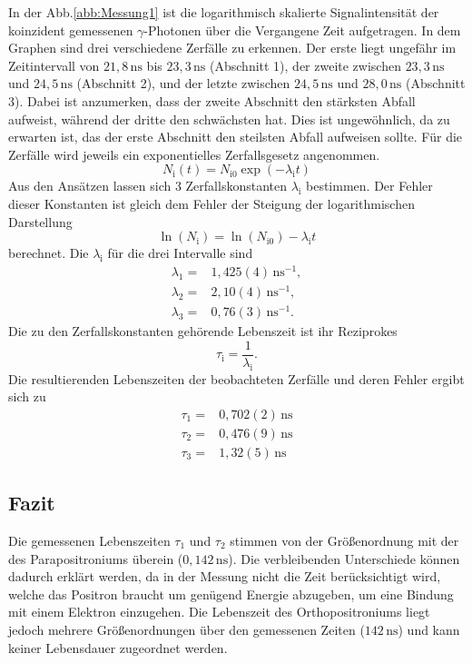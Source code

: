 \documentclass[numbers=noenddot,12pt,a4paper]{scrartcl}
\begin{document}
		In der Abb.\ref{abb:Messung1} ist die logarithmisch skalierte Signalintensität der koinzident gemessenen $\gamma$-Photonen über die Vergangene Zeit aufgetragen.
		In dem Graphen sind drei verschiedene Zerfälle zu erkennen. Der erste liegt ungefähr im Zeitintervall von $21,8\,\mathrm{ns}$ bis $23,3\,\mathrm{ns}$ (Abschnitt 1), der zweite zwischen $23,3\,\mathrm{ns}$ und $24,5\,\mathrm{ns}$ (Abschnitt 2), und der letzte zwischen $24,5\,\mathrm{ns}$ und $28,0\,\mathrm{ns}$ (Abschnitt 3). Dabei ist anzumerken, dass der zweite Abschnitt den stärksten Abfall aufweist, während der dritte den schwächsten hat. Dies ist ungewöhnlich, da zu erwarten ist, das der erste Abschnitt den steilsten Abfall aufweisen sollte. 
		Für die Zerfälle wird jeweils ein exponentielles Zerfallsgesetz angenommen.
		\begin{equation}
			N_\mathrm{i}(t) = N_{\mathrm{i}0} \exp\left(-\lambda_\mathrm{i} t\right)
		\end{equation}
		Aus den Ansätzen lassen sich 3 Zerfallskonstanten $\lambda_\mathrm{i}$ bestimmen. Der Fehler dieser Konstanten ist gleich dem Fehler der Steigung der logarithmischen Darstellung
		\begin{equation}
			\ln\left(N_\mathrm{i}\right) = \ln\left(N_{\mathrm{i}0}\right) - \lambda_\mathrm{i}t
		\end{equation}
		berechnet. Die $\lambda_\mathrm{i}$ für die drei Intervalle sind
		\begin{align}
		\lambda_1 =& 1,425(4)\,\mathrm{ns}^{-1}, \nonumber \\
		\lambda_{2} =& 2,10(4)\,\mathrm{ns}^{-1},  \\
		\lambda_{3} =& 0,76(3)\,\mathrm{ns}^{-1}. \nonumber 
		\end{align}
		Die zu den Zerfallskonstanten gehörende Lebenszeit ist ihr Reziprokes
		\begin{equation}
			\tau_\mathrm{i} = \frac{1}{\lambda_\mathrm{i}}.
		\end{equation}
		Die resultierenden Lebenszeiten der beobachteten Zerfälle und deren Fehler ergibt sich zu
		\begin{align}
			\tau_{1} =& 0,702(2)\,\mathrm{ns} \nonumber \\
			\tau_{2} =& 0,476(9)\,\mathrm{ns} \\
			\tau_{3} =& 1,32(5)\,\mathrm{ns} \nonumber 
		\end{align}
	\subsection{Fazit}
		Die gemessenen Lebenszeiten $\tau_1$ und $\tau_2$ stimmen von der Größenordnung mit der des Parapositroniums überein ($0,142\,\mathrm{ns}$). Die verbleibenden Unterschiede können dadurch erklärt werden, da in der Messung nicht die Zeit berücksichtigt wird, welche das Positron braucht um genügend Energie abzugeben, um eine Bindung mit einem Elektron einzugehen. Die Lebenszeit des Orthopositroniums liegt jedoch mehrere Größenordnungen über den gemessenen Zeiten ($142\,\mathrm{ns}$) und kann keiner Lebensdauer zugeordnet werden.\\
		
\end{document}
